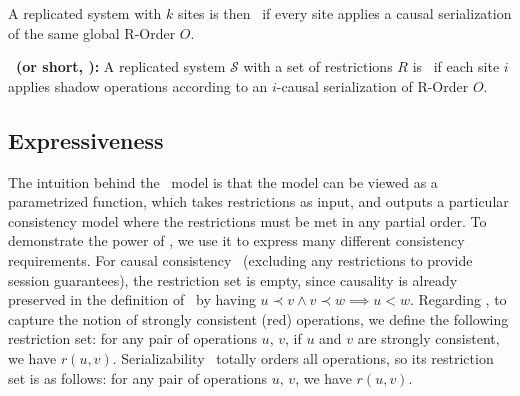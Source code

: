 
A replicated system with $k$ sites is then \PRCAJ\ if every site applies a
causal serialization of the same global R-Order $O$.

\begin{mydef}
\textbf{\PRCNF\ (or short, \PRCN):} A replicated system $\mathscr{S}$ with a set of restrictions $R$ is \PRCAJ\ if 
each site $i$ applies shadow operations according to an $i$-causal serialization of R-Order $O$.
\label{def:porconsistency}
\end{mydef}


\subsection{Expressiveness} The intuition behind the \PRCN\ model is that the model can be viewed as a
parametrized function, which takes restrictions as input, and outputs
a particular consistency model where the restrictions must be met in any partial order.
To demonstrate the power of \PRCN,
we use it to express many different consistency requirements. 
For causal consistency~\cite{Lloyd2011Causal} (excluding any restrictions to provide session guarantees), 
the restriction set is empty, since causality is already preserved in the definition 
of \PRCN\ by having $u \prec v \wedge v \prec w \implies u < w$. 
Regarding \RBCN, to capture the notion of strongly consistent (red) operations, we define 
the following restriction set: for any pair of operations $u$, $v$, if $u$ and $v$ are strongly consistent, 
we have $r(u,v)$. Serializability~\cite{Bernstein1987CCR} totally orders all
operations, so its restriction set is as follows: for any pair of operations $u$, $v$, we have $r(u, v)$.
